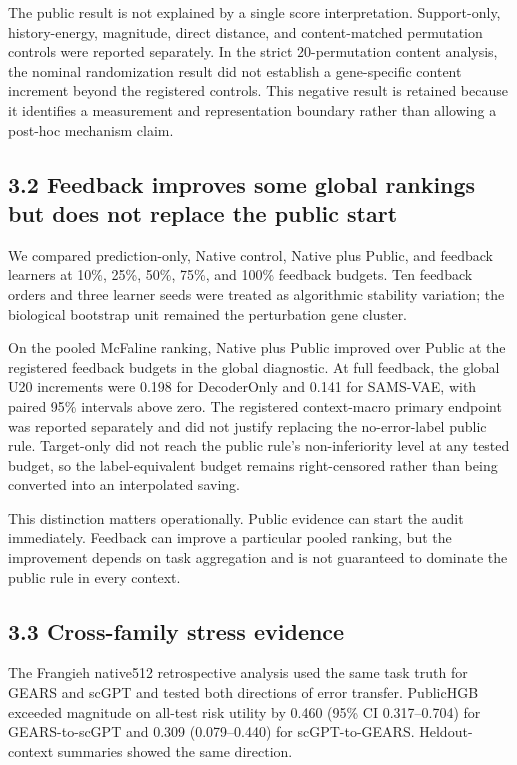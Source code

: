 \documentclass[journal]{IEEEtran}
\begin{document}
The public result is not explained by a single score interpretation. Support-only, history-energy, magnitude, direct distance, and content-matched permutation controls were reported separately. In the strict 20-permutation content analysis, the nominal randomization result did not establish a gene-specific content increment beyond the registered controls. This negative result is retained because it identifies a measurement and representation boundary rather than allowing a post-hoc mechanism claim.

\subsection{3.2 Feedback improves some global rankings but does not replace the public start}

We compared prediction-only, Native control, Native plus Public, and feedback learners at 10\%, 25\%, 50\%, 75\%, and 100\% feedback budgets. Ten feedback orders and three learner seeds were treated as algorithmic stability variation; the biological bootstrap unit remained the perturbation gene cluster.

On the pooled McFaline ranking, Native plus Public improved over Public at the registered feedback budgets in the global diagnostic. At full feedback, the global U20 increments were 0.198 for DecoderOnly and 0.141 for SAMS-VAE, with paired 95\% intervals above zero. The registered context-macro primary endpoint was reported separately and did not justify replacing the no-error-label public rule. Target-only did not reach the public rule's non-inferiority level at any tested budget, so the label-equivalent budget remains right-censored rather than being converted into an interpolated saving.

This distinction matters operationally. Public evidence can start the audit immediately. Feedback can improve a particular pooled ranking, but the improvement depends on task aggregation and is not guaranteed to dominate the public rule in every context.

\subsection{3.3 Cross-family stress evidence}

The Frangieh native512 retrospective analysis used the same task truth for GEARS and scGPT \cite{frangieh2021perturbcite,cui2024scgpt} and tested both directions of error transfer. PublicHGB exceeded magnitude on all-test risk utility by 0.460 (95\% CI 0.317--0.704) for GEARS-to-scGPT and 0.309 (0.079--0.440) for scGPT-to-GEARS. Heldout-context summaries showed the same direction.
\end{document}
